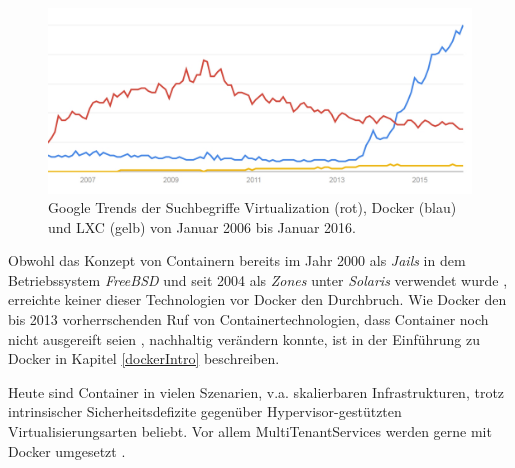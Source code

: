 \documentclass[../main.tex]{subfiles}
\begin{document}
  \begin{figure}[h]
      \centering
      \includegraphics[width=1.0\textwidth]{./images/googletrend_dockerVirtualizationLXC.jpg}
      \caption{Google Trends der Suchbegriffe \glqq{}Virtualization\grqq{} (rot), \glqq{}Docker\grqq{} (blau) und \glqq{}LXC\grqq{} (gelb) von Januar 2006 bis Januar 2016\cite{googleTrends}.}
      \label{fig:overview_googleTrends}
  \end{figure}

  Obwohl das Konzept von Containern bereits im Jahr 2000 als \emph{Jails} in dem Betriebssystem \emph{FreeBSD} und seit 2004 als \emph{Zones} unter \emph{Solaris} verwendet wurde \cite{zonesReleasenotes}\cite{jailsReleasenotes}, erreichte keiner dieser Technologien vor Docker den Durchbruch. Wie Docker den bis 2013 vorherrschenden Ruf von Containertechnologien, dass Container noch nicht ausgereift seien \cite[S.8]{containerVirtPerformance}, nachhaltig verändern konnte, ist in der Einführung zu Docker in Kapitel \ref{dockerIntro} beschreiben.

  Heute sind Container in vielen Szenarien, v.a. skalierbaren Infrastrukturen, trotz intrinsischer Sicherheitsdefizite gegenüber Hypervisor-gestützten Virtualisierungsarten beliebt. Vor allem \glspl{MultiTenantService} werden gerne mit Docker umgesetzt \cite[S.6]{dockerBook}\cite{dockerUnderstandingDocker}.

\end{document}
